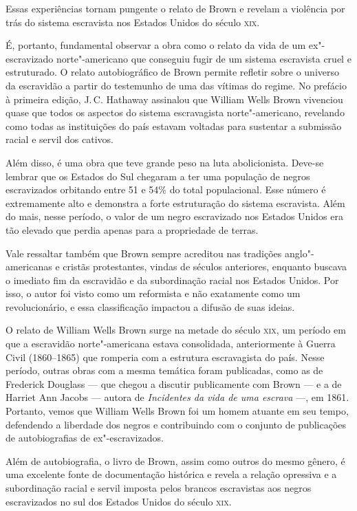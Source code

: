 Essas experiências tornam pungente o relato de Brown e revelam a
violência por trás do sistema escravista nos Estados Unidos do século
\textsc{xix}.

É, portanto, fundamental observar a obra como o relato da vida de um
ex"-escravizado norte"-americano que conseguiu fugir de um sistema
escravista cruel e estruturado. O relato autobiográfico de Brown permite
refletir sobre o universo da escravidão a partir do testemunho de uma
das vítimas do regime. No prefácio à primeira edição, J.\,C. Hathaway
assinalou que William Wells Brown vivenciou quase que todos os aspectos
do sistema escravagista norte"-americano, revelando como todas as
instituições do país estavam voltadas para sustentar a submissão racial
e servil dos cativos.

Além disso, é uma obra que teve grande peso na luta abolicionista.
Deve-se lembrar que os Estados do Sul chegaram a ter uma população de
negros escravizados orbitando entre 51 e 54\% do total populacional.
Esse número é extremamente alto e demonstra a forte estruturação do
sistema escravista. Além do mais, nesse período, o valor de um negro
escravizado nos Estados Unidos era tão elevado que perdia apenas para a
propriedade de terras.

Vale ressaltar também que Brown sempre acreditou nas tradições
anglo"-americanas e cristãs protestantes, vindas de séculos anteriores,
enquanto buscava o imediato fim da escravidão e da subordinação racial
nos Estados Unidos. Por isso, o autor foi visto como um reformista e não
exatamente como um revolucionário, e essa classificação impactou a
difusão de suas ideias.

O relato de William Wells Brown surge na metade do século \textsc{xix},
um período em que a escravidão
norte"-americana estava consolidada, anteriormente à Guerra Civil
(1860--1865) que romperia com a estrutura escravagista do país. Nesse
período, outras obras com a mesma temática foram publicadas, como as de
Frederick Douglass --- que chegou a discutir publicamente com Brown --- e
a de Harriet Ann Jacobs --- autora de \textit{Incidentes da vida de uma escrava}
---, em 1861. Portanto, vemos que William Wells Brown foi um homem
atuante em seu tempo, defendendo a liberdade dos negros e contribuindo
com o conjunto de publicações de autobiografias de ex"-escravizados.

Além de autobiografia, o livro de Brown, assim como outros do mesmo
gênero, é uma excelente fonte de documentação histórica e revela a
relação opressiva e a subordinação racial e servil imposta pelos brancos
escravistas aos negros escravizados no sul dos Estados Unidos do século \textsc{xix}.

